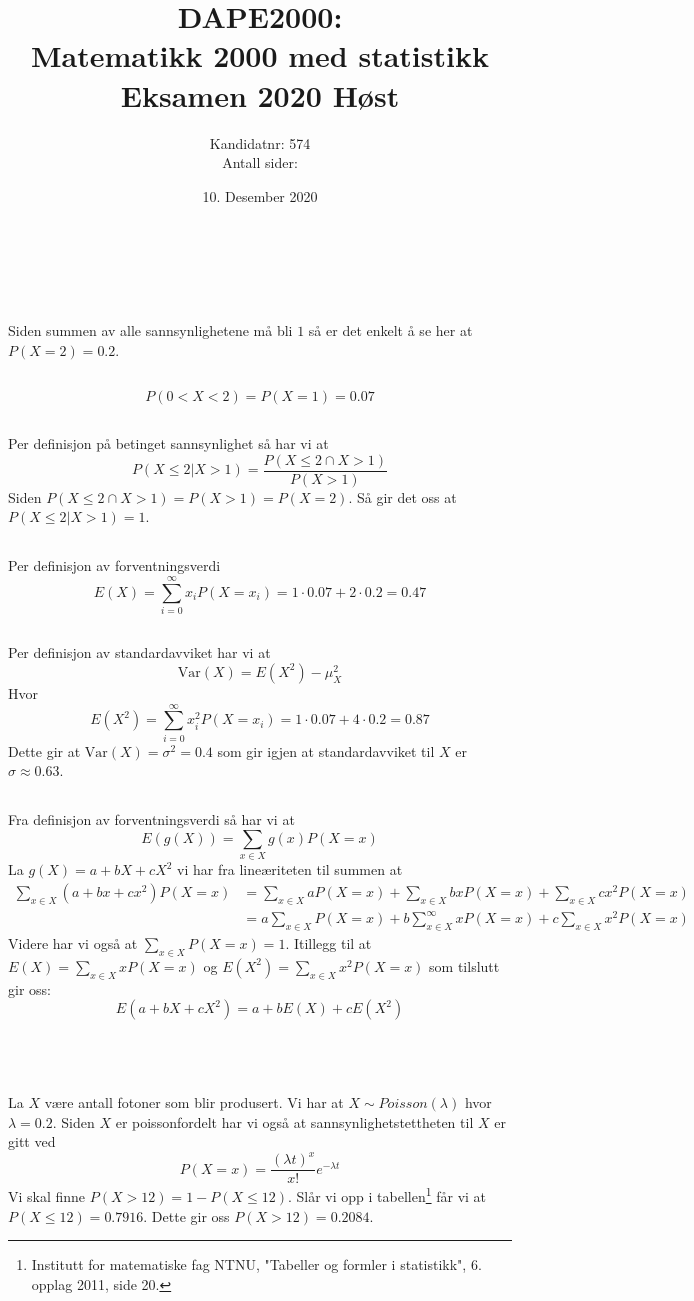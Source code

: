 \documentclass[12pt, a4paper,norsk]{article}
\title
{
	DAPE2000: \\
	Matematikk 2000 med statistikk\\
	Eksamen 2020 Høst
}
\author{Kandidatnr: 574\\Antall sider: \pageref{LastPage}}
\date{10. Desember 2020}
\newcommand{\oppgave}{\,\section{}}
\newcommand{\deloppgave}{\subsection{}}
\newcommand{\prob}[1]{P\left(#1\right)}
\newcommand{\var}[1]{\mathrm{Var}\left(#1\right)}
\newcommand{\expected}[1]{E\left(#1\right)}
\newcommand{\tabell}[1]{\footnote{
	Institutt for matematiske fag NTNU,
	"Tabeller og formler i statistikk", 
	6. opplag 2011, side #1.}}
\begin{document}
	\maketitle
	\clearpage
	\pagestyle{fancy}
	\oppgave
	Siden summen av alle sannsynlighetene må bli $1$ så er det enkelt å se her at $\prob{X = 2} = 0.2$.
	
	\deloppgave
	$$
	\prob{0 < X < 2} = \prob{X = 1} = 0.07
	$$
	
	\deloppgave
	Per definisjon på betinget sannsynlighet så har vi at 
	$$
	\prob{X \leq 2 | X > 1} = \frac{\prob{X \leq 2 \cap X > 1}}{\prob{X > 1}}
	$$
	Siden $\prob{X \leq 2 \cap X > 1} = \prob{X > 1} = \prob{X = 2}$. Så gir det oss at $\prob{X \leq 2 | X > 1} = 1$.
	
	\deloppgave
	Per definisjon av forventningsverdi
	$$
	\expected{X} = \sum_{i = 0}^\infty x_i\prob{X = x_i} = 1\cdot 0.07 + 2\cdot 0.2 = 0.47
	$$
	
	\deloppgave
	Per definisjon av standardavviket har vi at
	$$
	\var{X} = \expected{X^2} - \mu_X^2
	$$
	Hvor
	$$
	\expected{X^2} = \sum_{i = 0}^\infty x_i^2P(X = x_i) = 1\cdot 0.07 + 4\cdot 0.2 = 0.87
	$$
	Dette gir at $\var{X} = \sigma^2 = 0.4$ som gir igjen at standardavviket til $X$ er $\sigma \approx 0.63$.
	
	\deloppgave
	Fra definisjon av forventningsverdi så har vi at
	$$
	\expected{g\left(X\right)} = \sum_{x\in X} g(x)\prob{X = x}
	$$
	La $g\left(X\right) = a + bX + cX^2$ vi har fra lineæriteten til summen at
	\begin{align*}
	\sum_{x\in X} \left(a + bx + cx^2\right)\prob{X = x} &=
	\sum_{x\in X} a\prob{X = x} + \sum_{x\in X} bx\prob{X = x} + \sum_{x\in X} cx^2\prob{X = x}\\
	&= a\sum_{x\in X} \prob{X = x} + b\sum_{x\in X}^\infty x\prob{X = x} + c\sum_{x\in X} x^2\prob{X = x}
	\end{align*}
	Videre har vi også at $\sum_{x\in X}\prob{X = x} = 1$. Itillegg til at $\expected{X} = \sum_{x\in X}x\prob{X = x}$ og $\expected{X^2} = \sum_{x\in X} x^2\prob{X = x}$ som tilslutt gir oss:
	$$
	\expected{a + bX + cX^2} = a + b\expected{X} + c\expected{X^2}
	$$
	
	\oppgave
	\deloppgave
	La $X$ være antall fotoner som blir produsert. Vi har at $X \sim Poisson(\lambda)$ hvor $\lambda = 0.2$. Siden $X$ er poissonfordelt har vi også at sannsynlighetstettheten til $X$ er gitt ved
	$$
	\prob{X = x} = \frac{\left(\lambda t\right)^x}{x!}e^{-\lambda t}
	$$
	Vi skal finne $P(X > 12) = 1 - P(X \leq 12)$. Slår vi opp i tabellen\tabell{20} får vi at $P(X\leq 12) = 0.7916$. Dette gir oss $P(X > 12) = 0.2084$.
	
\end{document}
